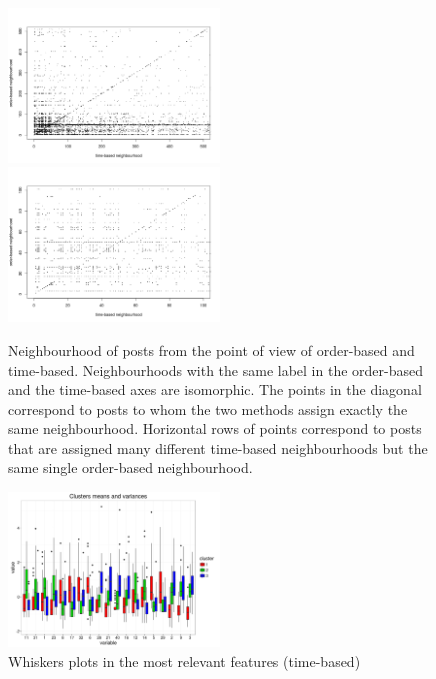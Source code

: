 \documentclass[conference]{IEEEtran}
\begin{document}
\begin{figure}
\centering
\includegraphics[width=0.5\textwidth]{confusion_time_order_gameofthrones}%
\includegraphics[width=0.5\textwidth]{confusion_time_order_gameofthrones_zoom}
\caption{Neighbourhood of posts from the point of view of order-based and time-based. Neighbourhoods with the same label in the order-based and the time-based axes are isomorphic. The points in the diagonal correspond to posts to whom the two methods assign exactly the same neighbourhood. Horizontal rows of points correspond to posts that are assigned many different time-based neighbourhoods but the same single order-based neighbourhood.}
\label{fig:confusion}
\end{figure}



\begin{figure}
	\centering
	\includegraphics[width=0.5\textwidth]{whiskers}
	\caption{Whiskers plots in the most relevant features (time-based)}
	\label{fig:PCA}
\end{figure}
\end{document}
